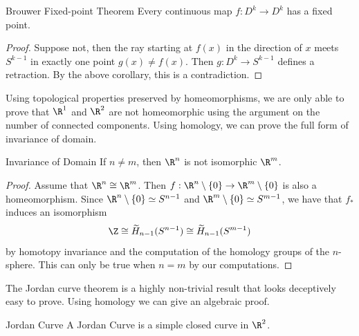 \documentclass[a4paper]{article}
\begin{document}
\begin{thm}{Brouwer Fixed-point Theorem}{} Every continuous map $f:D^k\to D^k$ has a fixed point. 
\begin{proof}
Suppose not, then the ray starting at $f(x)$ in the direction of $x$ meets $S^{k-1}$ in exactly one point $g(x)\neq f(x)$. Then $g:D^k\to S^{k-1}$ defines a retraction. By the above corollary, this is a contradiction. 
\end{proof}
\end{thm}

Using topological properties preserved by homeomorphisms, we are only able to prove that $\R^1$ and $\R^2$ are not homeomorphic using the argument on the number of connected components. Using homology, we can prove the full form of invariance of domain. 

\begin{crl}{Invariance of Domain}{} If $n\neq m$, then $\R^n$ is not isomorphic $\R^m$. 
\begin{proof}
Assume that $\R^n\cong\R^m$. Then $f:\R^n\setminus\{0\}\to\R^m\setminus\{0\}$ is also a homeomorphism. Since $\R^n\setminus\{0\}\simeq S^{n-1}$ and $\R^m\setminus\{0\}\simeq S^{m-1}$, we have that $f_\ast$ induces an isomorphism $$\Z\cong\widetilde{H}_{n-1}(S^{n-1})\cong\widetilde{H}_{n-1}(S^{m-1})$$ by homotopy invariance and the computation of the homology groups of the $n$-sphere. This can only be true when $n=m$ by our computations. 
\end{proof}
\end{crl}

The Jordan curve theorem is a highly non-trivial result that looks deceptively easy to prove. Using homology we can give an algebraic proof. 

\begin{defn}{Jordan Curve}{} A Jordan Curve is a simple closed curve in $\R^2$. 
\end{defn}
\end{document}
